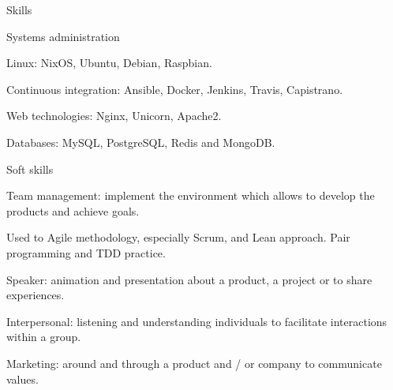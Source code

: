 \begin{rSection}{Skills}
  \begin{rSubsection}{Systems administration}{}{}{}
    \item Linux: NixOS, Ubuntu, Debian, Raspbian.
    \item Continuous integration: Ansible, Docker, Jenkins, Travis, Capistrano.
    \item Web technologies: Nginx, Unicorn, Apache2.
    \item Databases: MySQL, PostgreSQL, Redis and MongoDB.
  \end{rSubsection}


  \begin{rSubsection}{Soft skills}{}{}{}
    \item Team management: implement the environment which allows to develop the products and achieve goals.
    \item Used to Agile methodology, especially Scrum, and Lean approach. Pair programming and TDD practice.
    \item Speaker: animation and presentation about a product, a project or to share experiences.
    \item Interpersonal: listening and understanding individuals to facilitate interactions within a group.
    \item Marketing: around and through a product and / or company to communicate values.
  \end{rSubsection}

\end{rSection}
